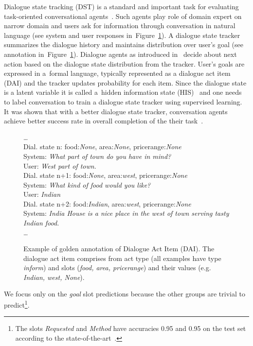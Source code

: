 \documentclass{itatnew}
\def\area#1{{\color{darkgreen}area:\it #1}}
\def\food#1#2{{Dial. state #1: \color{blue}food:\it #2}}
\def\pricerange#1{{\color{orange}pricerange:\it #1}}
\def\sys#1{{\color{purple}System: \it #1}}
\def\usr#1{{\color{brown}User: \it #1}}
\begin{document}
Dialogue state tracking (DST) is a standard and important task for evaluating task-oriented conversational agents~\cite{williams2013dialog, henderson2014second, henderson2014third}.
Such agents play role of domain expert on narrow domain and users ask for information through conversation in natural language (see system and user responses in~Figure~\ref{fig:example}).
A dialogue state tracker summarizes the dialogue history and maintains distribution over user's goal (see annotation in~Figure~\ref{fig:example}).
Dialogue agents as introduced in~\cite{young2010hidden} decide about next action based on the dialogue state distribution from the tracker.
User's goals are expressed in a~formal language, typically represented as a dialogue act item (DAI) and the tracker updates probability for each item. 
Since the dialogue state is a latent variable it is called a~hidden information state (HIS)~\cite{young2010hidden} and one needs to label conversation to train a dialogue state tracker using supervised learning.
It was shown that with a better dialogue state tracker, conversation agents achieve better success rate in overall completion of the their task~\cite{jurvcivcek2012reinforcement}.

\begin{figure}
   \dots \\
    \food{n}{None}, \area{None}, \pricerange{None} \\
    \sys{What part of town do you have in mind?} \\
    \usr{West part of town.} \\
    \food{n+1}{None}, \area{west}, \pricerange{None} \\
    \sys{What kind of food would you like?} \\
    \usr{Indian} \\
    \food{n+2}{Indian}, \area{west}, \pricerange{None} \\
    \sys{India House is a nice place in the west of town serving tasty Indian food.} \\
    \dots
    \caption{Example of golden annotation of Dialogue Act Item (DAI). The dialogue act item comprises from act type (all examples have type {\it inform}) and slots ({\it food, area, pricerange}) and their values (e.g. {\it Indian, west, None}).}
\vspace{-0.70em}
\label{fig:example}
\end{figure}

We focus only on the {\it goal} slot predictions because the other groups are trivial to predict\footnote{The slots {\it Requested} and {\it Method} have accuracies 0.95 and 0.95 on the test set according to the state-of-the-art~\cite{williams2014web}.}.
\end{document}
